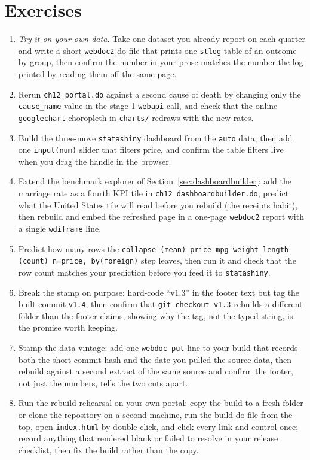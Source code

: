 \documentclass[
    a4paper,
    fontsize=10pt,
    twoside=true,
    numbers=noenddot,
]{kaobook}
\begin{document}
\section*{Exercises}
\begin{enumerate}
\item \emph{Try it on your own data.} Take one dataset you already report on each quarter and write a short \texttt{webdoc2} do-file that prints one \texttt{stlog} table of an outcome by group, then confirm the number in your prose matches the number the log printed by reading them off the same page.
\item Rerun \texttt{ch12\_portal.do} against a second cause of death by changing only the \texttt{cause\_name} value in the stage-1 \texttt{webapi} call, and check that the online \texttt{googlechart} choropleth in \texttt{charts/} redraws with the new rates.
\item Build the three-move \texttt{statashiny} dashboard from the \texttt{auto} data, then add one \texttt{input(num)} slider that filters price, and confirm the table filters live when you drag the handle in the browser.
\item Extend the benchmark explorer of Section~\ref{sec:dashboardbuilder}: add the marriage rate as a fourth KPI tile in \texttt{ch12\_dashboardbuilder.do}, predict what the United States tile will read before you rebuild (the receipts habit), then rebuild and embed the refreshed page in a one-page \texttt{webdoc2} report with a single \texttt{wdiframe} line.
\item Predict how many rows the \texttt{collapse (mean) price mpg weight length (count) n=price, by(foreign)} step leaves, then run it and check that the row count matches your prediction before you feed it to \texttt{statashiny}.
\item Break the stamp on purpose: hard-code \enquote{v1.3} in the footer text but tag the built commit \texttt{v1.4}, then confirm that \texttt{git checkout v1.3} rebuilds a different folder than the footer claims, showing why the tag, not the typed string, is the promise worth keeping.
\item Stamp the data vintage: add one \texttt{webdoc put} line to your build that records both the short commit hash and the date you pulled the source data, then rebuild against a second extract of the same source and confirm the footer, not just the numbers, tells the two cuts apart.
\item Run the rebuild rehearsal on your own portal: copy the build to a fresh folder or clone the repository on a second machine, run the build do-file from the top, open \texttt{index.html} by double-click, and click every link and control once; record anything that rendered blank or failed to resolve in your release checklist, then fix the build rather than the copy.
\end{enumerate}
\end{document}
